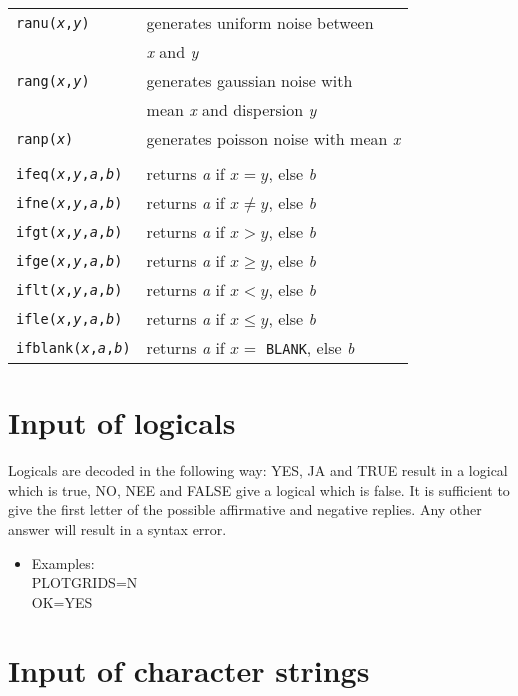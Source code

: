 {\begin{tabular}{ll}
{\tt ranu({\it x},{\it y})}&generates uniform noise between\\
&{\it x} and {\it y}\\
{\tt rang({\it x},{\it y})}&generates gaussian noise with\\
&mean {\it x} and dispersion {\it y}\\
{\tt ranp({\it x})}&generates poisson noise with mean {\it x}\\
\\
{\tt ifeq({\it x},{\it y},{\it a},{\it b})}&returns 
{\it a} if $x=y$, else {\it b} \\
{\tt ifne({\it x},{\it y},{\it a},{\it b})}&returns
{\it a} if $x \neq y$, else {\it b} \\
{\tt ifgt({\it x},{\it y},{\it a},{\it b})}&returns
{\it a} if $x > y$, else {\it b} \\
{\tt ifge({\it x},{\it y},{\it a},{\it b})}&returns
{\it a} if $x \geq y$, else {\it b} \\
{\tt iflt({\it x},{\it y},{\it a},{\it b})}&returns 
{\it a} if $x<y$, else {\it b} \\
{\tt ifle({\it x},{\it y},{\it a},{\it b})}&returns 
{\it a} if $x\leq y$, else {\it b} \\
{\tt ifblank({\it x},{\it a},{\it b})}&returns 
{\it a} if $x=$ {\tt BLANK}, else {\it b} \\
\end{tabular}
}


\section{Input of logicals}

Logicals are decoded in the following way: YES, JA and TRUE result
in a logical which is true, NO, NEE and FALSE give a logical which
is false. It is sufficient to give the first letter of the possible
affirmative and negative replies. Any other answer will result in
a syntax error.

\begin{itemize}
      \item  Examples:      \\
             PLOTGRIDS=N    \\
             OK=YES         \\
\end{itemize}



\section{Input of character strings}

